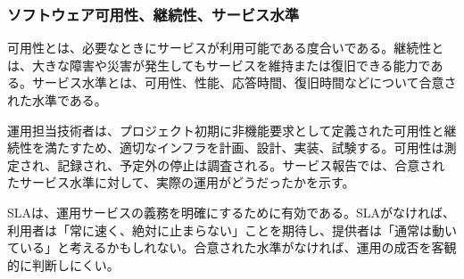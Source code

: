 \subsubsection{ソフトウェア可用性、継続性、サービス水準}

可用性とは、必要なときにサービスが利用可能である度合いである。継続性とは、大きな障害や災害が発生してもサービスを維持または復旧できる能力である。サービス水準とは、可用性、性能、応答時間、復旧時間などについて合意された水準である。

運用担当技術者は、プロジェクト初期に非機能要求として定義された可用性と継続性を満たすため、適切なインフラを計画、設計、実装、試験する。可用性は測定され、記録され、予定外の停止は調査される。サービス報告では、合意されたサービス水準に対して、実際の運用がどうだったかを示す。

SLAは、運用サービスの義務を明確にするために有効である。SLAがなければ、利用者は「常に速く、絶対に止まらない」ことを期待し、提供者は「通常は動いている」と考えるかもしれない。合意された水準がなければ、運用の成否を客観的に判断しにくい。
